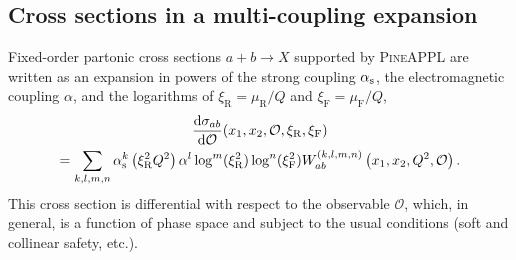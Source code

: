 \begin{itemize}
\end{itemize}


\subsection{Cross sections in a multi-coupling expansion}
\label{sec:multi-coupling-expansion}

Fixed-order partonic cross sections $a + b \to X$ supported by \textsc{PineAPPL} are written as an expansion in powers of the strong coupling $\alpha_\mathrm{s}$, the electromagnetic coupling $\alpha$, and the logarithms of $\xi_\mathrm{R} = \mu_\mathrm{R} / Q$ and $\xi_\mathrm{F} = \mu_\mathrm{F} / Q$,
\begin{multline}
\frac{\mathrm{d} \sigma_{ab}}{\mathrm{d} \mathcal{O}} (x_1, x_2, \mathcal{O}, \xi_\mathrm{R}, \xi_\mathrm{F}) \\
= \sum_{k,l,m,n} \alpha_\mathrm{s}^k \left( \xi_\mathrm{R}^2 Q^2 \right) \alpha^l \log^m ( \xi_\mathrm{R}^2 ) \log^n ( \xi_\mathrm{F}^2 ) W_{ab}^{(k,l,m,n)} \left( x_1, x_2, Q^2, \mathcal{O} \right) \text{.}
\label{eq:expansion}
\end{multline}
This cross section is differential with respect to the observable $\mathcal{O}$, which, in general, is a function of phase space and subject to the usual conditions (soft and collinear safety, etc.).

